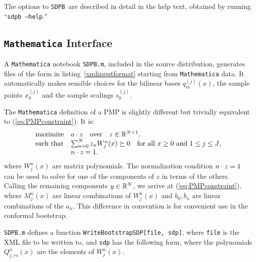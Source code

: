 \documentclass[12pt]{article}
\numberwithin{equation}{section}
\renewcommand{\be}{\begin{eqnarray}}
\renewcommand{\ee}{\end{eqnarray}}
\newcommand\SDPB{\texttt{SDPB}}
\begin{document}
The options to \SDPB\ are described in detail in the help text, obtained by running ``\texttt{sdpb --help}."

\subsection{\texttt{Mathematica} Interface}

A \texttt{Mathematica} notebook \texttt{SDPB.m}, included in the source distribution, generates files of the form in listing~\ref{xmlinputformat} starting from \texttt{Mathematica} data.  It automatically makes sensible choices for the bilinear bases $q_m^{(j)}(x)$, the sample points $x_k^{(j)}$ and the sample scalings $s_k^{(j)}$.

The \texttt{Mathematica} definition of a PMP is slightly different but trivially equivalent to (\ref{eq:PMPconstraint}).  It is:
\be
\label{eq:PMPconstraintMathematica}
\begin{array}{ll}
\textrm{maximize} & a\.z\quad\textrm{over}\quad z \in \R^{N+1},\\
\textrm{such that} & \sum_{n=0}^{N} z_n W^n_j(x) \succeq 0 \quad \textrm{for all $x\geq 0$ and $1 \leq j \leq J$},\\
 & n\.z = 1.
\end{array}
\ee
where $W_j^n(x)$ are matrix polynomials.  The normalization condition $n\.z=1$ can be used to solve for one of the components of $z$ in terms of the others.  Calling the remaining components $y\in \R^N$, we arrive at (\ref{eq:PMPconstraint}), where $M_j^n(x)$ are linear combinations of $W^n_j(x)$ and $b_0,b_n$ are linear combinations of the $a_n$.  This difference in convention is for convenient use in the conformal bootstrap.

\texttt{SDPB.m} defines a function \texttt{WriteBootstrapSDP[file, sdp]}, where \texttt{file} is the XML file to be written to, and \texttt{sdp} has the following form, where the polynomials $Q^n_{j,rs}(x)$ are the elements of $W_j^n(x)$.
\end{document}
